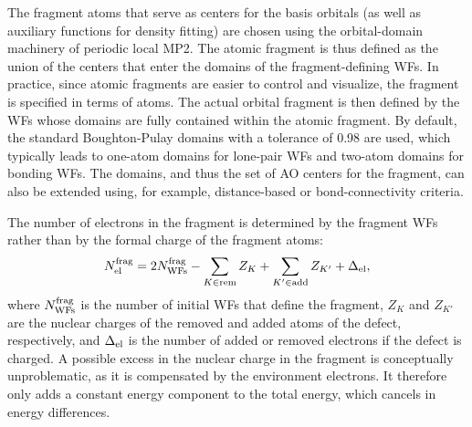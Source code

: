 \documentclass[aip,jcp,reprint]{revtex4-2}
\begin{document}
The fragment atoms that serve as centers for the basis orbitals (as well as auxiliary functions for density fitting) are chosen using the orbital-domain machinery of periodic local MP2.\cite{Usvyat_periodic_LMP2} The atomic fragment is thus defined as the union of the centers that enter the domains of the fragment-defining WFs.
In practice, since atomic fragments are easier to control and visualize, the fragment is specified in terms of atoms. The actual orbital fragment is then defined by the WFs whose domains are fully contained within the atomic fragment. By default, the standard Boughton-Pulay domains\cite{Boughton1993} with a tolerance of 0.98 are used, which typically leads to one-atom domains for lone-pair WFs and two-atom domains for bonding WFs. The domains, and thus the set of AO centers for the fragment, can also be extended using, for example, distance-based or bond-connectivity criteria.


The number of electrons in the fragment is determined by the fragment WFs rather than by the formal charge of the fragment atoms:
\begin{eqnarray}
  N_{\rm el}^{\rm frag}=2N_{\rm WFs}^{\rm frag}-\sum_{K\in{\rm rem}}Z_{K}+\sum_{K'\in{\rm add}}Z_{K'}+\Delta_{\rm el},\label{eq:n_el}
\end{eqnarray}
where $N_{\rm WFs}^{\rm frag}$ is the number of initial WFs that define the fragment, $Z_{K}$ and $Z_{K'}$ are the nuclear charges of the removed and added atoms of the defect, respectively, and $\Delta_{\rm el}$ is the number of added or removed electrons if the defect is charged. A possible excess in the nuclear charge in the fragment is conceptually unproblematic, as it is compensated by the environment electrons. It therefore only adds a constant energy component to the total energy, which cancels in energy differences.
\end{document}
